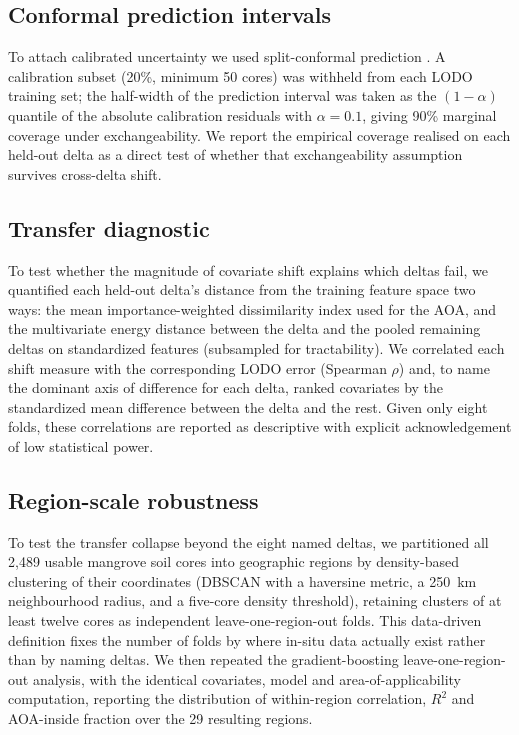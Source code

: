 \documentclass[twocolumn,9pt]{extarticle}
\begin{document}
\subsection*{Conformal prediction intervals}
To attach calibrated uncertainty we used split-conformal prediction
\cite{vovk2005,romano2019cqr,angelopoulos2023conformal}. A calibration
subset (20\%, minimum 50 cores) was withheld from each LODO training set; the
half-width of the prediction interval was taken as the $(1-\alpha)$ quantile of the
absolute calibration residuals with $\alpha=0.1$, giving 90\% marginal coverage under
exchangeability. We report the empirical coverage realised on each held-out delta as a
direct test of whether that exchangeability assumption survives cross-delta shift.

\subsection*{Transfer diagnostic}
To test whether the magnitude of covariate shift explains which deltas fail, we
quantified each held-out delta's distance from the training feature space two ways: the
mean importance-weighted dissimilarity index used for the AOA, and the multivariate
energy distance between the delta and the pooled remaining deltas on standardized
features (subsampled for tractability). We correlated each shift measure with the
corresponding LODO error (Spearman $\rho$) and, to name the dominant axis of difference
for each delta, ranked covariates by the standardized mean difference between the delta
and the rest. Given only eight folds, these correlations are reported as descriptive
with explicit acknowledgement of low statistical power.

\subsection*{Region-scale robustness}
To test the transfer collapse beyond the eight named deltas, we partitioned all 2{,}489
usable mangrove soil cores into geographic regions by density-based clustering of their
coordinates (DBSCAN with a haversine metric, a 250~km neighbourhood radius, and a
five-core density threshold), retaining clusters of at least twelve cores as independent
leave-one-region-out folds. This data-driven definition fixes the number of folds by
where in-situ data actually exist rather than by naming deltas. We then repeated the
gradient-boosting leave-one-region-out analysis, with the identical covariates, model
and area-of-applicability computation, reporting the distribution of within-region
correlation, $R^2$ and AOA-inside fraction over the 29 resulting regions.
\end{document}
